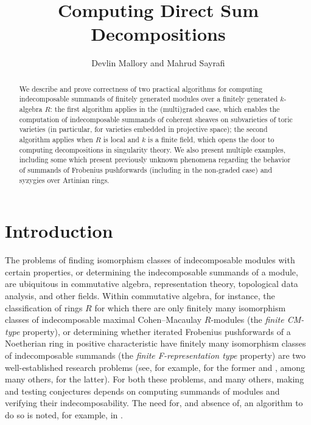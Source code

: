 \documentclass[12pt]{article}
\title{Computing Direct Sum Decompositions}
\author{Devlin Mallory and Mahrud Sayrafi}
\theoremstyle{theorem}
\numberwithin{thm}{section}
\theoremstyle{definition}
\begin{document}
\maketitle

\begin{abstract}
  We describe and prove correctness of two practical algorithms for computing indecomposable summands of finitely generated modules over a finitely generated $k$-algebra $R$: the first algorithm applies in the (multi)graded case, which enables the computation of indecomposable summands of coherent sheaves on subvarieties of toric varieties (in particular, for varieties embedded in projective space); the second algorithm applies when $R$ is local and $k$ is a finite field, which opens the door to computing decompositions in singularity theory. We also present multiple examples, including some which present previously unknown phenomena regarding the behavior of summands of Frobenius pushforwards (including in the non-graded case) and syzygies over Artinian rings.
\end{abstract}

\section{Introduction}

The problems of finding isomorphism classes of indecomposable modules with certain properties, or determining the indecomposable summands of a module, are ubiquitous in commutative algebra, representation theory, topological data analysis, and other fields. Within commutative algebra, for instance, the classification of rings $R$ for which there are only finitely many isomorphism classes of indecomposable maximal Cohen--Macaulay $R$-modules (the \emph{finite CM-type} property), or determining whether iterated Frobenius pushforwards of a Noetherian ring in positive characteristic have finitely many isomorphism classes of indecomposable summands (the \emph{finite F-representation type} property) are two well-established research problems (see, for example, \cite{Yoshino90,LW12} for the former and \cite{SVdB97,Hara15,TT08}, among many others, for the latter). For both these problems, and many others, making and testing conjectures depends on computing summands of modules and verifying their indecomposability.
The need for, and absence of, an algorithm to do so is noted, for example, in
\cite[15.10.9]{Eisenbud95}.
\end{document}
